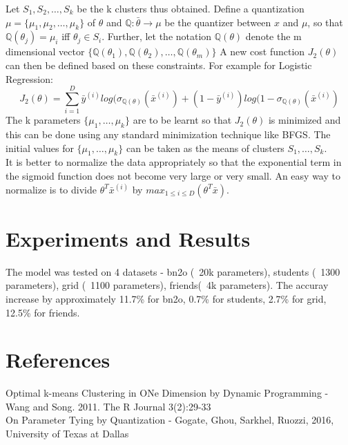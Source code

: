 \documentclass[conference]{IEEEtran}
\begin{document}
Let $S_1,S_2,\dots,S_k$ be the k clusters thus obtained.
Define  a quantization $\mu=\{\mu_1,\mu_2,\dots,\mu_k\}$ of $\theta$ and $\mathbb{Q}:\bar{\theta}\rightarrow\mu$ be the quantizer between $x$ and $\mu$, so that $\mathbb{Q}(\theta_j)=\mu_i$ iff $\theta_j \in S_i$. 
Further, let the notation $\mathbb{Q}(\theta)$ denote the m dimensional vector $\{\mathbb{Q}(\theta_1),\mathbb{Q}(\theta_2),\dots,\mathbb{Q}(\theta_m)\}$
A new cost function $J_2(\theta)$ can then be defined based on these constraints. For example for Logistic Regression:  
$$J_2(\theta)=\sum_{i=1}^{D}\bar{y}^{(i)}log(\sigma_{\mathbb{Q}(\theta)}(\bar{x}^{(i)}) + (1-\bar{y}^{(i)})log(1 - \sigma_{\mathbb{Q}(\theta)}(\bar{x}^{(i)})$$
The k parameters $\{\mu_1,\dots,\mu_k\}$ are to be learnt so that $J_2(\theta)$ is minimized and this can be done using any standard minimization technique like BFGS. The initial values for $\{\mu_1,\dots,\mu_k\}$ can be taken as the means of clusters $S_1,\dots,S_k$.\\

It is better to normalize the data appropriately so that the exponential term in the sigmoid function does not become very large or very small. An easy way to normalize is to divide $\theta^{T}\bar{x}^{(i)}$ by $max_{1\leq i\leq D}(\theta^{T}\bar{x})$.

\section{Experiments and Results}
The model was tested on 4 datasets - bn2o (~20k parameters), students (~1300 parameters), grid (~1100 parameters), friends(~4k parameters).
The accuray increase by approximately 11.7\% for bn2o, 0.7\% for students, 2.7\% for grid, 
12.5\% for friends.

\section{References}
Optimal k-means Clustering in ONe Dimension by Dynamic Programming - Wang and Song. 2011. The R Journal 3(2):29-33\\
On Parameter Tying by Quantization - Gogate, Ghou, Sarkhel, Ruozzi, 2016, University of Texas at Dallas
\end{document}
